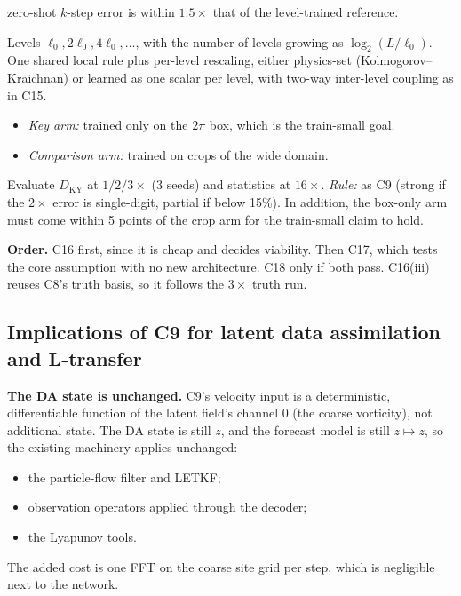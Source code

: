 \documentclass[11pt]{article}
\begin{document}
\begin{description}[leftmargin=*]
  zero-shot $k$-step error is within $1.5\times$ that of the
  level-trained reference.
\item[C18 --- recursive scale-shared model.] Levels $\ell_0, 2\ell_0,
  4\ell_0,\dots$, with the number of levels growing as
  $\log_2(L/\ell_0)$. One shared local rule plus per-level rescaling,
  either physics-set (Kolmogorov--Kraichnan) or learned as one scalar per
  level, with two-way inter-level coupling as in C15.
  \begin{itemize}[leftmargin=*]
  \item \emph{Key arm:} trained only on the $2\pi$ box, which is the
    train-small goal.
  \item \emph{Comparison arm:} trained on crops of the wide domain.
  \end{itemize}
  Evaluate $D_{\mathrm{KY}}$ at $1/2/3\times$ (3 seeds) and statistics at
  $16\times$. \emph{Rule:} as C9 (strong if the $2\times$ error is
  single-digit, partial if below 15\%). In addition, the box-only arm
  must come within 5 points of the crop arm for the train-small claim to
  hold.
\end{description}

\textbf{Order.} C16 first, since it is cheap and decides viability. Then
C17, which tests the core assumption with no new architecture. C18 only
if both pass. C16(iii) reuses C8's truth basis, so it follows the
$3\times$ truth run.

\subsection{Implications of C9 for latent data assimilation and L-transfer}
\label{sec:c9_da}

\textbf{The DA state is unchanged.} C9's velocity input is a
deterministic, differentiable function of the latent field's channel 0
(the coarse vorticity), not additional state. The DA state is still $z$,
and the forecast model is still $z\mapsto z$, so the existing machinery
applies unchanged:
\begin{itemize}[leftmargin=*]
\item the particle-flow filter and LETKF;
\item observation operators applied through the decoder;
\item the Lyapunov tools.
\end{itemize}
The added cost is one FFT on the coarse site grid per step, which is
negligible next to the network.
\end{document}

